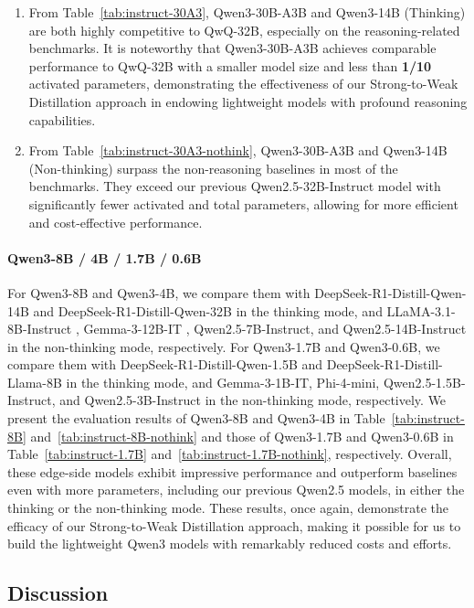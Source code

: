 \begin{enumerate}[label=(\arabic*)]
    \item From Table~\ref{tab:instruct-30A3}, Qwen3-30B-A3B and Qwen3-14B (Thinking) are both highly competitive to QwQ-32B, especially on the reasoning-related benchmarks.
    It is noteworthy that Qwen3-30B-A3B achieves comparable performance to QwQ-32B with a smaller model size and less than \textbf{1/10} activated parameters, demonstrating the effectiveness of our Strong-to-Weak Distillation approach in endowing lightweight models with profound reasoning capabilities.
    \item From Table~\ref{tab:instruct-30A3-nothink}, Qwen3-30B-A3B and Qwen3-14B (Non-thinking) surpass the non-reasoning baselines in most of the benchmarks.
    They exceed our previous Qwen2.5-32B-Instruct model with significantly fewer activated and total parameters, allowing for more efficient and cost-effective performance.
\end{enumerate}


\paragraph{Qwen3-8B / 4B / 1.7B / 0.6B}
For Qwen3-8B and Qwen3-4B, we compare them with DeepSeek-R1-Distill-Qwen-14B and DeepSeek-R1-Distill-Qwen-32B in the thinking mode, and LLaMA-3.1-8B-Instruct \citep{llama3}, Gemma-3-12B-IT \citep{gemma3}, Qwen2.5-7B-Instruct, and Qwen2.5-14B-Instruct in the non-thinking mode, respectively.
For Qwen3-1.7B and Qwen3-0.6B, we compare them with DeepSeek-R1-Distill-Qwen-1.5B and DeepSeek-R1-Distill-Llama-8B in the thinking mode, and Gemma-3-1B-IT, Phi-4-mini, Qwen2.5-1.5B-Instruct, and Qwen2.5-3B-Instruct in the non-thinking mode, respectively.
We present the evaluation results of Qwen3-8B and Qwen3-4B in Table~\ref{tab:instruct-8B} and~\ref{tab:instruct-8B-nothink} and those of Qwen3-1.7B and Qwen3-0.6B in Table~\ref{tab:instruct-1.7B} and~\ref{tab:instruct-1.7B-nothink}, respectively.
Overall, these edge-side models exhibit impressive performance and outperform baselines even with more parameters, including our previous Qwen2.5 models, in either the thinking or the non-thinking mode.
These results, once again, demonstrate the efficacy of our Strong-to-Weak Distillation approach, making it possible for us to build the lightweight Qwen3 models with remarkably reduced costs and efforts.


\subsection{Discussion}


